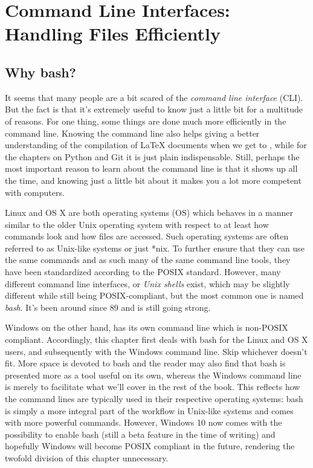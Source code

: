 \chapter{Command Line Interfaces: Handling Files Efficiently}\label{ch:bash}

\section{Why bash?}
It seems that many people are a bit scared of the \emph{command line interface} (CLI). But the fact is that it's extremely useful to know just a little bit for a multitude of reasons. For one thing, some things are done much more efficiently in the command line. Knowing the command line also helps giving a better understanding of the compilation of \LaTeX{} documents when we get to , while for the chapters on Python and Git it is just plain indispensable. Still, perhaps the most important reason to learn about the command line is that it shows up all the time, and knowing just a little bit about it makes you a lot more competent with computers.

Linux and OS X are both operating systems (OS) which behaves in a manner similar to the older Unix operating system with respect to at least how commands look and how files are accessed. Such operating systems are often referred to as Unix-like systems or just *nix. To further ensure that they can use the same commands and as such many of the same command line tools, they have been standardized according to the POSIX standard. However, many different command line interfaces, or \emph{Unix shells} exist, which may be slightly different while still being POSIX-compliant, but the most common one is named \emph{bash}. It's been around since 89 and is still going strong.

Windows on the other hand, has its own command line which is non-POSIX compliant. Accordingly, this chapter first deals with bash for the Linux and OS X users, and subsequently with the Windows command line. Skip whichever doesn't fit.  More space is devoted to bash and the reader may also find that bash is presented more as a tool useful on its own, whereas the Windows command line is merely to facilitate what we'll cover in the rest of the book. This reflects how the command lines are typically used in their respective operating systems: bash is simply a more integral part of the workflow in Unix-like systems and comes with more powerful commands. However, Windows 10 now comes with the possibility to enable bash (still a beta feature in the time of writing) and hopefully Windows will become POSIX compliant in the future, rendering the twofold division of this chapter unnecessary.

